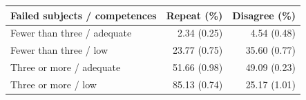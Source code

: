 \begin{tabular}{p{7cm}rr}
\toprule
Failed subjects / competences & Repeat (\%) & Disagree (\%) \\
\midrule
Fewer than three / adequate & 2.34 (0.25) & 4.54 (0.48) \\
Fewer than three / low & 23.77 (0.75) & 35.60 (0.77) \\
Three or more / adequate & 51.66 (0.98) & 49.09 (0.23) \\
Three or more / low & 85.13 (0.74) & 25.17 (1.01) \\
\bottomrule
\end{tabular}
